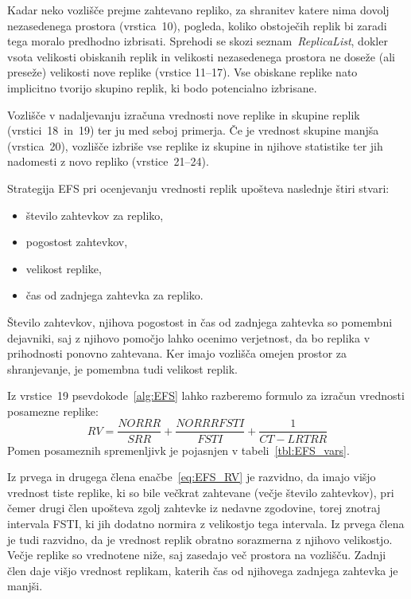\documentclass[a4paper, 12pt]{book}
\begin{document}
Kadar neko vozlišče prejme zahtevano repliko, za shranitev katere nima dovolj
nezasedenega prostora (vrstica~10), pogleda, koliko
obstoječih replik bi zaradi tega moralo predhodno izbrisati. Sprehodi se skozi
seznam~\textit{\mbox{ReplicaList}}, dokler vsota velikosti obiskanih replik in
velikosti nezasedenega prostora ne doseže (ali preseže) velikosti nove replike
(vrstice 11--17). Vse obiskane replike nato implicitno
tvorijo skupino replik, ki bodo potencialno izbrisane.

Vozlišče v nadaljevanju izračuna vrednosti nove replike in skupine replik
(vrstici~18~in~19) ter ju med seboj primerja. Če je
vrednost skupine manjša (vrstica~20), vozlišče izbriše vse replike
iz skupine in njihove statistike ter jih nadomesti z novo repliko
(vrstice~21--24).

Strategija EFS pri ocenjevanju vrednosti replik upošteva naslednje štiri
stvari:
\begin{itemize}
  \item število zahtevkov za repliko,
  \item pogostost zahtevkov,
  \item velikost replike,
  \item čas od zadnjega zahtevka za repliko.
\end{itemize}

Število zahtevkov, njihova pogostost in čas od zadnjega zahtevka so pomembni
dejavniki, saj z njihovo pomočjo lahko ocenimo verjetnost, da bo replika
v prihodnosti ponovno zahtevana. Ker imajo vozlišča omejen prostor za
shranjevanje, je pomembna tudi velikost replik.

\begin{samepage}
Iz vrstice~19 psevdokode~\ref{alg:EFS} lahko razberemo
formulo za izračun vrednosti posamezne replike:
\begin{equation}
  \mathit{RV} = \frac{\mathit{NORRR}}{\mathit{SRR}} +
                      \frac{\mathit{NORRRFSTI}}{\mathit{FSTI}} +
                      \frac{1}{\mathit{CT} - \mathit{LRTRR}}
  \label{eq:EFS_RV}
\end{equation}
Pomen posameznih spremenljivk je pojasnjen v tabeli~\ref{tbl:EFS_vars}.
\end{samepage}

Iz prvega in drugega člena enačbe~\eqref{eq:EFS_RV} je razvidno, da imajo
višjo vrednost tiste replike, ki so bile večkrat zahtevane (večje število
zahtevkov), pri čemer drugi člen upošteva zgolj zahtevke iz nedavne zgodovine,
torej znotraj intervala FSTI, ki jih dodatno normira z velikostjo tega
intervala. Iz prvega člena je tudi razvidno, da je vrednost replik obratno
sorazmerna z njihovo velikostjo. Večje replike so vrednotene niže, saj
zasedajo več prostora na vozlišču. Zadnji člen daje višjo vrednost replikam,
katerih čas od njihovega zadnjega zahtevka je manjši.
\end{document}
